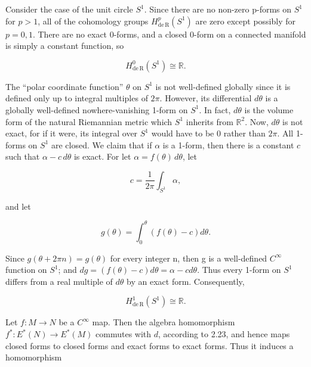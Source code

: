 \begin{examples}\label{thm:4.14}
Consider the case of the unit circle  $ S^1 $. Since there are no non-zero p-forms on  $ S^1 $ for  $ p > 1 $, all of the cohomology groups  $ H_{\mathrm{de\,R}}^{p}(S^{1}) $ are zero except possibly for  $ p = 0, 1 $. There are no exact 0-forms, and a closed 0-form on a connected manifold is simply a constant function, so

\begin{equation}
\tag{1}\label{eq:4.14:1}
H_{\mathrm{de\,R}}^{0}(S^{1})\cong\mathbb{R}.
\end{equation}

The “polar coordinate function” $\theta$ on $S^1$ is not well-defined globally since it is defined only up to integral multiples of $2\pi$. However, its differential $d\theta$ is a globally well-defined nowhere-vanishing 1-form on $S^1$. In fact, $d\theta$ is the volume form of the natural Riemannian metric which $S^1$ inherits from $\mathbb{R}^2$. Now, $d\theta$ is not exact, for if it were, its integral over $S^1$ would have to be 0 rather than $2\pi$. All 1-forms on $S^1$ are closed. We claim that if $\alpha$ is a 1-form, then there is a constant $c$ such that $\alpha - c\,d\theta$ is exact. For let $\alpha = f(\theta)\,d\theta$, let

\[
c=\frac{1}{2\pi}\int_{S^{1}}\alpha,
\]

and let

\[
g(\theta)=\int_{0}^{\theta}\left(f(\theta)-c\right)d\theta.
\]

Since  $ g(\theta + 2\pi n) = g(\theta) $ for every integer n, then g is a well-defined  $ C^\infty $ function on  $ S^1 $; and  $ dg = (f(\theta) - c) d\theta = \alpha - c d\theta $. Thus every 1-form on  $ S^1 $ differs from a real multiple of  $ d\theta $ by an exact form. Consequently,

\begin{equation}
\tag{2}\label{eq:4.14:2}
H_{\mathrm{de\,R}}^{1}(S^{1})\cong\mathbb{R}.
\end{equation}

\end{examples}

\label{thm:4.15}
Let $f: M \to N$ be a $C^\infty$ map. Then the algebra homomorphism $f^{*}: E^*(N) \to E^*(M)$ commutes with $d$, according to 2.23, and hence maps closed forms to closed forms and exact forms to exact forms. Thus it induces a homomorphism

